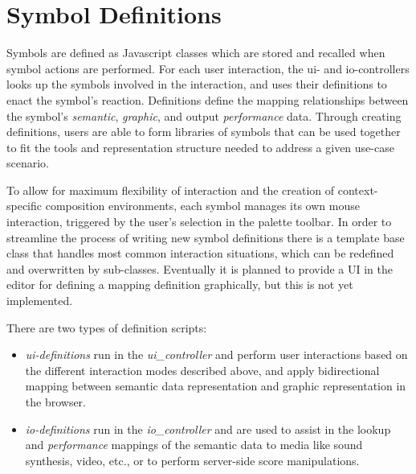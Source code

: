 \documentclass{article}
\def\uicontroller{\textit{ui\_controller}\xspace}
\def\iocontroller{\textit{io\_controller}\xspace}
\begin{document}
\section{Symbol Definitions}\label{library_definitions_api}

Symbols are defined as Javascript classes which are stored and recalled when symbol actions are performed. 
For each user interaction, the ui- and io-controllers looks up the symbols involved in the interaction, and uses their definitions to enact the symbol's reaction. 
Definitions define the mapping relationships between the symbol's \textit{semantic}, \textit{graphic}, and output \textit{performance} data.
Through creating definitions, users are able to form libraries of symbols that can be used together to fit the tools and representation structure needed to address a given use-case scenario.

To allow for maximum flexibility of interaction and the creation of context-specific composition environments, each symbol manages its own mouse interaction, triggered by the user's selection in the palette toolbar. 
In order to streamline the process of writing new symbol definitions there is a template base class that handles most common interaction situations, which can be redefined and overwritten by sub-classes. Eventually it is planned to provide a UI in the editor for defining a mapping definition graphically, but this is not yet implemented.

There are two types of definition scripts:
\begin{itemize}\itemsep0pt 
\item \textit{ui-definitions} run in the \uicontroller and perform user interactions based on the different interaction modes described above, and apply bidirectional mapping between semantic data representation and graphic representation in the browser.
\item \textit{io-definitions} run in the \iocontroller and are used to assist in the lookup and \textit{performance} mappings of the semantic data to media like sound synthesis, video, etc., or to perform server-side score manipulations.
\end{itemize}
\end{document}

